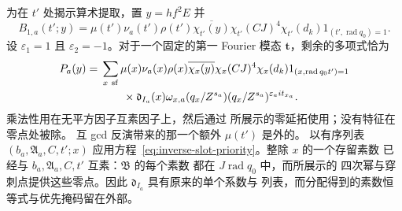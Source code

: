 为在 \(t'\) 处揭示算术提取，置 \(y=hf^2E\) 并
\[
 B_{1,a}(t';y)=\mu(t')\nu_a(t')\rho(t')\overline{\chi_{t'}(y)}
       \chi_{t'}(CJ)^4\chi_{t'}(d_k)1_{(t',\operatorname{rad}q_0)=1}.
\]
设 \(\varepsilon_1=1\) 且 \(\varepsilon_2=-1\)。对于一个固定的第一
Fourier 模态 \(\boldsymbol t\)，剩余的多项式恰为
\begin{equation}\label{eq:inverse-first-polynomial}
 \begin{split}
 P_a(y)={}&\sum_{x\ {\rm sf}}\mu(x)\nu_a(x)\rho(x)
       \overline{\chi_x(y)}\chi_x(CJ)^4\chi_x(d_k)
       1_{(x,\operatorname{rad}q_0t')=1}\\
 &\qquad\times\mathfrak d_{I_a}(x)\omega_{x,a}(q_x/Z^{s_a})
                  (q_x/Z^{s_a})^{\varepsilon_a it_{x_a}}.
 \end{split}
\end{equation}
乘法性用在无平方因子互素因子上，然后通过
所展示的零延拓使用；没有特征在零点处被除。
互 gcd 反演带来的那一个额外 \(\mu(t')\) 是外的。
以有序列表
\((b_a,\mathfrak A_a,C,t';x)\) 应用方程~\eqref{eq:inverse-slot-priority}。整除 \(x\) 的一个存留素数
已经与 \(b_a,\mathfrak A_a,C,t'\) 互素：\(\mathfrak B\) 的每个素数
都在 \(J\operatorname{rad}q_0\) 中，而所展示的
四次幂与穿刺点提供这些零点。因此
\(\mathfrak d_{I_a}\) 具有原来的单个系数与
列表，而分配得到的素数恒等式与优先掩码留在外部。

